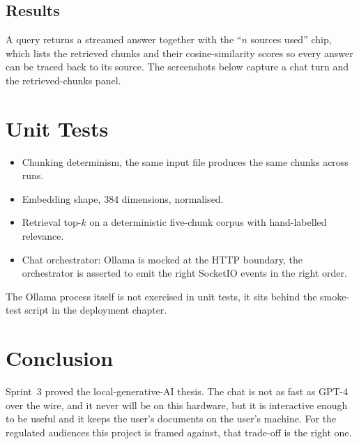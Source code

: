 \documentclass[12pt, a4paper, oneside]{report}
\begin{document}
\subsection{Results}

A query returns a streamed answer together with the ``$n$ sources used''
chip, which lists the retrieved chunks and their cosine-similarity
scores so every answer can be traced back to its source. The
screenshots below capture a chat turn and the retrieved-chunks panel.


\section{Unit Tests}

\begin{itemize}
    \item Chunking determinism, the same input file produces the
        same chunks across runs.
    \item Embedding shape, 384 dimensions, normalised.
    \item Retrieval top-$k$ on a deterministic five-chunk corpus
        with hand-labelled relevance.
    \item Chat orchestrator: Ollama is mocked at the HTTP boundary,
        the orchestrator is asserted to emit the right SocketIO
        events in the right order.
\end{itemize}

The Ollama process itself is not exercised in unit tests, it sits
behind the smoke-test script in the deployment chapter.

\section*{Conclusion}

Sprint~3 proved the local-generative-AI thesis. The chat is not as
fast as GPT-4 over the wire, and it never will be on this hardware,
but it is interactive enough to be useful and it keeps the user's
documents on the user's machine. For the regulated audiences this
project is framed against, that trade-off is the right one.
\end{document}

